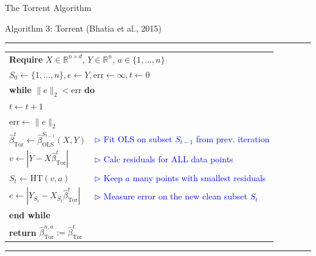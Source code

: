 \begin{frame}{The Torrent Algorithm \cite{bhatia2015robustregressionhardthresholding}}
    \begin{block}{Algorithm 3: Torrent (Bhatia et al., 2015)}
        \vspace{0.1cm}
        \hrule
        \vspace{0.1cm}
        \begin{tabular}{l l}
            \multicolumn{2}{l}{\textbf{Require} $X \in \mathbb{R}^{n \times d}$, $Y \in \mathbb{R}^n$, $a \in \{1, \dots, n\}$} \\
            \multicolumn{2}{l}{$S_0 \leftarrow \{1, \dots, n\}, e \leftarrow Y, \text{err} \leftarrow \infty, t \leftarrow 0$} \\
            \multicolumn{2}{l}{\textbf{while} $\|e\|_2 < \text{err}$ \textbf{do}} \\
            \hspace{0.5cm} $t \leftarrow t + 1$ & \\
            \hspace{0.5cm} $\text{err} \leftarrow \|e\|_2$ & \\
            \hspace{0.5cm} $\hat{\beta}_{\text{Tor}}^t \leftarrow \hat{\beta}_{\text{OLS}}^{S_{t-1}}(X, Y)$ & \textcolor{blue}{$\triangleright$ Fit OLS on subset $S_{t-1}$ from prev. iteration}\\
            \hspace{0.5cm} $v \leftarrow |Y - X\hat{\beta}_{\text{Tor}}^t|$ & \textcolor{blue}{$\triangleright$ Calc residuals for ALL data points} \\
            \hspace{0.5cm} $S_t \leftarrow \text{HT}(v, a)$ & \textcolor{blue}{$\triangleright$ Keep $a$ many points with smallest residuals} \\
            \hspace{0.5cm} $e \leftarrow |Y_{S_t} - X_{S_t}\hat{\beta}_{\text{Tor}}^t|$ & \textcolor{blue}{$\triangleright$ Measure error on the new clean subset $S_t$} \\
            \multicolumn{2}{l}{\textbf{end while}} \\
            \multicolumn{2}{l}{\textbf{return} $\hat{\beta}_{\text{Tor}}^{n,a} := \hat{\beta}_{\text{Tor}}^t$} 
        \end{tabular}
        \vspace{0.1cm}
        \hrule
        \vspace{0.1cm}
    \end{block}
\end{frame}

